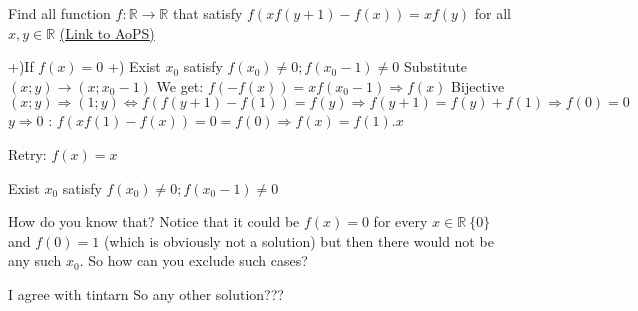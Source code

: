 \begin{problem}
	Find all function $f:\mathbb{R}\to\mathbb{R}$ that satisfy $f(xf(y+1)-f(x))=xf(y)$ for all $x,y \in \mathbb{R}$
	\flushright \href{https://artofproblemsolving.com/community/c6h617153}{(Link to AoPS)}
\end{problem}



\begin{solution}
	+)If $f(x) = 0$
+) Exist $x_0$ satisfy $f(x_0) \ne 0; f(x_0-1) \ne 0$
   Substitute $(x;y) \rightarrow (x;x_0-1)$ 
We get:    $f(-f(x))=xf(x_0-1) \Rightarrow f(x)$ Bijective
 $(x;y) \Rightarrow (1;y) \Leftrightarrow f(f(y+1)-f(1))=f(y) \Rightarrow f(y+1)=f(y)+f(1) \Rightarrow f(0)=0$
 $y \Rightarrow 0$ : $f(xf(1)-f(x))=0=f(0) \Rightarrow f(x)=f(1).x$

Retry: $f(x)=x$
\end{solution}



\begin{solution}
	\begin{tcolorbox} Exist $x_0$ satisfy $f(x_0) \ne 0; f(x_0-1) \ne 0$\end{tcolorbox}
How do you know that? Notice that it could be $f(x)=0$ for every $x \in \mathbb{R} \ \{0\}$ and $f(0)=1$ (which is obviously not a solution) but then there would not be any such $x_0$. So how can you exclude such cases?
\end{solution}



\begin{solution}
	I agree with tintarn
So any other solution???
\end{solution}




